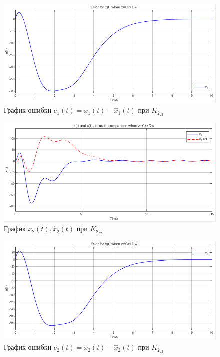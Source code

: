 \documentclass[a4paper, 12pt]{article}
\begin{document}
    \begin{figure}[H]
        \centering
        \includegraphics[scale=0.75]{3task_xe1cd.png}
        \captionsetup{skip=0pt}
        \caption{График ошибки $e_1(t)=x_1(t)-\hat{x}_1(t)$ при $K_{2_{z2}}$}
        \label{fig:3task_xe1cd}
    \end{figure}
    \begin{figure}[H]
        \centering
        \includegraphics[scale=0.75]{3task_xxh2cd.png}
        \captionsetup{skip=0pt}
        \caption{График $x_2(t),\hat{x}_2(t)$ при $K_{2_{z2}}$}
        \label{fig:3task_xxh2cd}
    \end{figure}
    \begin{figure}[H]
        \centering
        \includegraphics[scale=0.75]{3task_xe2cd.png}
        \captionsetup{skip=0pt}
        \caption{График ошибки $e_2(t)=x_2(t)-\hat{x}_2(t)$ при $K_{2_{z2}}$}
        \label{fig:3task_xe2cd}
    \end{figure}
\end{document}
